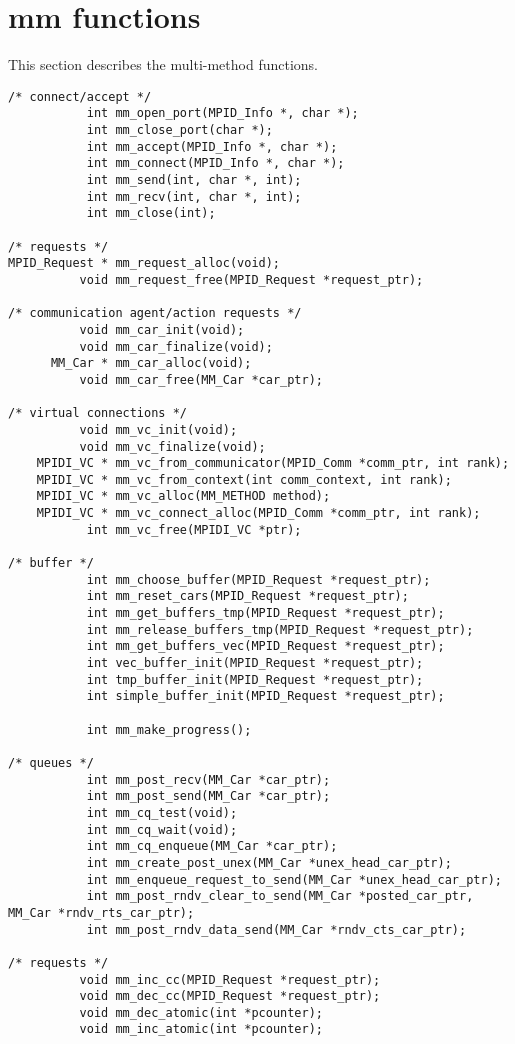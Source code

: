 \documentclass[dvipdfm,twoside,11pt]{article}
\begin{document}
\section{mm functions}
This section describes the multi-method functions.
\begin{verbatim}
/* connect/accept */
           int mm_open_port(MPID_Info *, char *);
           int mm_close_port(char *);
           int mm_accept(MPID_Info *, char *);
           int mm_connect(MPID_Info *, char *);
           int mm_send(int, char *, int);
           int mm_recv(int, char *, int);
           int mm_close(int);

/* requests */
MPID_Request * mm_request_alloc(void);
          void mm_request_free(MPID_Request *request_ptr);

/* communication agent/action requests */
          void mm_car_init(void);
          void mm_car_finalize(void);
      MM_Car * mm_car_alloc(void);
          void mm_car_free(MM_Car *car_ptr);

/* virtual connections */
          void mm_vc_init(void);
          void mm_vc_finalize(void);
    MPIDI_VC * mm_vc_from_communicator(MPID_Comm *comm_ptr, int rank);
    MPIDI_VC * mm_vc_from_context(int comm_context, int rank);
    MPIDI_VC * mm_vc_alloc(MM_METHOD method);
    MPIDI_VC * mm_vc_connect_alloc(MPID_Comm *comm_ptr, int rank);
           int mm_vc_free(MPIDI_VC *ptr);

/* buffer */
           int mm_choose_buffer(MPID_Request *request_ptr);
           int mm_reset_cars(MPID_Request *request_ptr);
           int mm_get_buffers_tmp(MPID_Request *request_ptr);
           int mm_release_buffers_tmp(MPID_Request *request_ptr);
           int mm_get_buffers_vec(MPID_Request *request_ptr);
           int vec_buffer_init(MPID_Request *request_ptr);
           int tmp_buffer_init(MPID_Request *request_ptr);
           int simple_buffer_init(MPID_Request *request_ptr);

           int mm_make_progress();

/* queues */
           int mm_post_recv(MM_Car *car_ptr);
           int mm_post_send(MM_Car *car_ptr);
           int mm_cq_test(void);
           int mm_cq_wait(void);
           int mm_cq_enqueue(MM_Car *car_ptr);
           int mm_create_post_unex(MM_Car *unex_head_car_ptr);
           int mm_enqueue_request_to_send(MM_Car *unex_head_car_ptr);
           int mm_post_rndv_clear_to_send(MM_Car *posted_car_ptr, MM_Car *rndv_rts_car_ptr);
           int mm_post_rndv_data_send(MM_Car *rndv_cts_car_ptr);

/* requests */
          void mm_inc_cc(MPID_Request *request_ptr);
          void mm_dec_cc(MPID_Request *request_ptr);
          void mm_dec_atomic(int *pcounter);
          void mm_inc_atomic(int *pcounter);
\end{verbatim}
\end{document}

